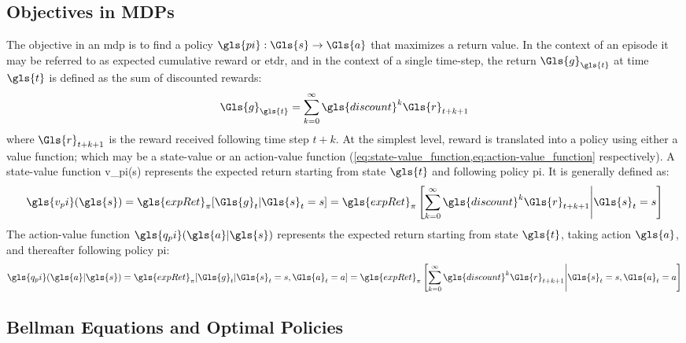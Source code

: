     \subsection*{Objectives in MDPs}%

The objective in an \gls{mdp} is to find a policy 
\(\gls{pi}: \Gls{s} \rightarrow \Gls{a}\) that maximizes a return value. 
In the context of an episode it may be referred to as expected cumulative 
reward or \gls{etdr}, and in the context of a single time-step, 
the return \(\Gls{g}_{\gls{t}}\) at time \(\gls{t}\) is defined as the sum of discounted rewards:
\begin{equation}
    \Gls{g}_{\gls{t}} = \sum_{k=0}^{\infty} \gls{discount}^k \Gls{r}_{t+k+1}
    \label{eq:sum_discounted_rewards}
\end{equation}
where \(\Gls{r}_{t+k+1}\) is the reward received following time step \(t+k\).
At the simplest level, reward is translated into a policy using either a 
value function; which may be a state-value or an action-value function 
(\cref{eq:state-value_function,eq:action-value_function} respectively).
A state-value function \gls{v_pi}(\gls{s}) represents the expected return starting 
from state \(\gls{t}\) and following policy \gls{pi}. It is generally defined as:
\begin{equation}
    \gls{v_pi}(\gls{s}) 
    = \gls{expRet}_\pi [\Gls{g}_{t}| \Gls{s}_t = s] = \gls{expRet}_\pi \left[
        \sum_{k=0}^{\infty} \gls{discount}^k \Gls{r}_{t+k+1} 
        \middle| \Gls{s}_t = s \right]
    \label{eq:state-value_function}
\end{equation}
The action-value function \(\gls{q_pi}(\gls{a}|\gls{s})\) represents the expected return 
starting from state \(\gls{t}\), taking action \(\gls{a}\), 
and thereafter following policy \gls{pi}:
\begin{equation}
    \gls{q_pi}(\gls{a}|\gls{s}) 
    = \gls{expRet}_\pi [\Gls{g}_{t}| \Gls{s}_t = s, \Gls{a}_t = a] 
    = \gls{expRet}_\pi \left[ 
        \sum_{k=0}^{\infty} \gls{discount}^k \Gls{r}_{t+k+1}
        \middle| \Gls{s}_t=s, \Gls{a}_t=a \right]
    \label{eq:action-value_function}
\end{equation}

    \subsection*{Bellman Equations and Optimal Policies}%

